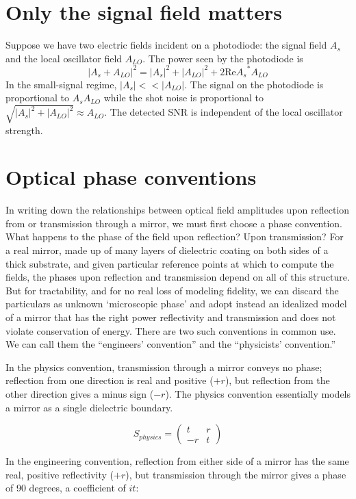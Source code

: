 \section{Only the signal field matters}

Suppose we have two electric fields incident on a photodiode: the
signal field $A_s$ and the local oscillator field $A_{LO}$.  The power
seen by the photodiode is
$$ \left| A_s + A_{LO} \right|^2 = 
   |A_s|^2 + |A_{LO}|^2 + 2 \mathrm{ Re } {A_s}^*A_{LO}$$
In the small-signal regime, $|A_s| << |A_{LO}|$.  The signal on the
photodiode is proportional to $A_s A_{LO}$ while the shot noise is
proportional to $\sqrt{|A_s|^2+|A_{LO}|^2}\approx A_{LO}$.  
  The detected SNR is independent of the local oscillator strength.

\section{Optical phase conventions}

In writing down the relationships between optical field amplitudes
upon reflection from or transmission through a mirror, we must first
choose a phase convention. What happens to the phase of the field upon
reflection? Upon transmission? For a real mirror, made up of many
layers of dielectric coating on both sides of a thick substrate, and
given particular reference points at which to compute the fields, the
phases upon reflection and transmission depend on all of this
structure. But for tractability, and for no real loss of modeling
fidelity, we can discard the particulars as unknown `microscopic
phase' and adopt instead an idealized model of a mirror that has the
right power reflectivity and transmission and does not violate
conservation of energy. There are two such conventions in common
use. We can call them the ``engineers' convention'' and the
``physicists' convention.''

In the physics convention, transmission through a mirror conveys no
phase; reflection from one direction is real and positive ($+r$),
but reflection from the other direction gives a minus sign ($-r$).
The physics convention essentially models a mirror as a single dielectric
boundary.

\[
S_{physics}=\left(\begin{array}{cc}
t & r\\
-r & t
\end{array}\right)
\]


In the engineering convention, reflection from either side of a mirror
has the same real, positive reflectivity ($+r$), but transmission
through the mirror gives a phase of 90 degrees, a coefficient of $it$:

